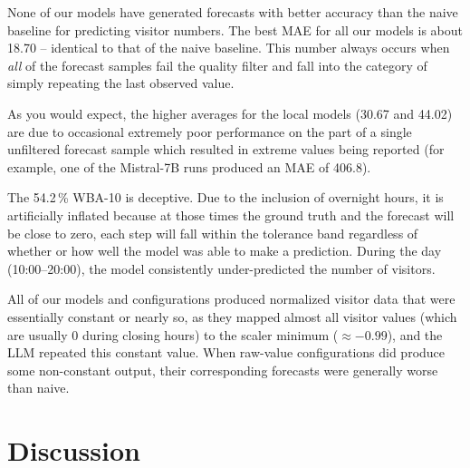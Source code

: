 \documentclass[11pt,a4paper]{article}
\begin{document}
None of our models have generated forecasts with better accuracy than the naive baseline for predicting visitor numbers. The best MAE for all our models is about 18.70 -- identical to that of the naive baseline. This number always occurs when \emph{all} of the forecast samples fail the quality filter and fall into the category of simply repeating the last observed value.

As you would expect, the higher averages for the local models (30.67 and 44.02) are due to occasional extremely poor performance on the part of a single unfiltered forecast sample which resulted in extreme values being reported (for example, one of the Mistral-7B runs produced an MAE of 406.8).

The 54.2\,\% WBA-10 is deceptive. Due to the inclusion of overnight hours, it is artificially inflated because at those times the ground truth and the forecast will be close to zero, each step will fall within the tolerance band regardless of whether or how well the model was able to make a prediction. During the day (10:00--20:00), the model consistently under-predicted the number of visitors.

All of our models and configurations produced normalized visitor data that were essentially constant or nearly so, as they mapped almost all visitor values (which are usually 0 during closing hours) to the scaler minimum (\( \approx -0.99 \)), and the LLM repeated this constant value. When raw-value configurations did produce some non-constant output, their corresponding forecasts were generally worse than naive.


\section{Discussion}
\end{document}
